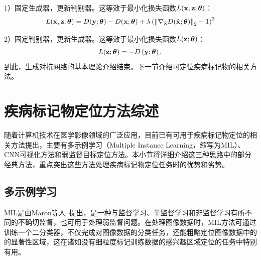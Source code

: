 1）固定生成器，更新判别器。这等效于最小化损失函数$L(\mathbf{x},\mathbf{z};\mbox{\boldmath $\theta$})$：
\begin{equation}
\begin{aligned}
	L(\mathbf{x},\mathbf{z};\mbox{\boldmath $\theta$})=D({{\mathbf{y}}};\mbox{\boldmath $\theta$})-D({\mathbf{x}};\mbox{\boldmath $\theta$})+\lambda\left(\left\|\nabla_{\hat{\mathbf{x}}} D(\hat{\mathbf{x}};\mbox{\boldmath $\theta$})\right\|_{2}-1\right)^{2}
\end{aligned}
\end{equation}

2）固定判别器，更新生成器。这等效于最小化损失函数$L(\mathbf{z};\mbox{\boldmath $\theta$})$：
\begin{equation}
	L(\mathbf{z};\mbox{\boldmath $\theta$})=-D\left(\mathbf{y};\mbox{\boldmath $\theta$}\right).
\end{equation}
\noindent 到此，生成对抗网络的基本理论介绍结束。下一节介绍可定位疾病标记物的相关方法。
\section{疾病标记物定位方法综述}\label{sec:related_work}
随着计算机技术在医学影像领域的广泛应用，目前已有可用于疾病标记物定位的相关方法提出，主要有多示例学习（Multiple Instance Learning，缩写为MIL）、CNN可视化方法和弱监督目标定位方法。本小节将详细介绍这三种思路中的部分经典方法，重点突出这些方法处理疾病标记物定位任务时的优势和劣势。
\subsection{多示例学习}
MIL是由Maron等人~\cite{maron1998framework}提出，是一种与监督学习、半监督学习和非监督学习有所不同的不确切监督，也可用于处理弱监督问题。在处理图像数据时，MIL方法可通过训练一个二分类器，不仅完成对图像数据的分类任务，还能粗略定位图像数据中的的显著性区域，这在诸如没有细粒度标记训练数据的感兴趣区域定位的任务中特别有用。

